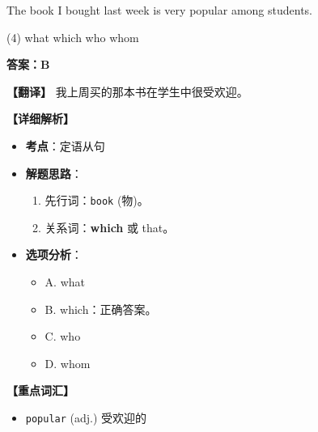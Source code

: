 \documentclass[11pt, a4paper]{article}
\newcommand{\analysis}[4]{
    \begin{solutionbox}
        \textbf{答案：#1}
        
        \textbf{【翻译】} #2
        
        \textbf{【详细解析】}
        #3
        
        \textbf{【重点词汇】}
        #4
    \end{solutionbox}
}
\newcommand{\blank}{\underline{\hspace{1.5cm}}}
\begin{document}
\begin{questions}
    \item The book \blank I bought last week is very popular among students.
    \begin{tasks}(4)
        \task what \task which \task who \task whom
    \end{tasks}
    \analysis{B}{我上周买的那本书在学生中很受欢迎。}{
        \begin{itemize}
            \item \textbf{考点}：定语从句
            \item \textbf{解题思路}：
                \begin{enumerate}
                    \item 先行词：\texttt{book} (物)。
                    \item 关系词：\textbf{which} 或 that。
                \end{enumerate}
            \item \textbf{选项分析}：
                \begin{itemize}
                    \item A. what
                    \item B. which：正确答案。
                    \item C. who
                    \item D. whom
                \end{itemize}
        \end{itemize}
    }{
        \begin{itemize}
            \item \texttt{popular} (adj.) 受欢迎的
        \end{itemize}
    }


\end{questions}
\end{document}
